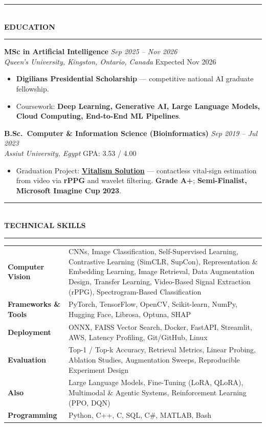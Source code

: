 \documentclass[10pt, a4paper]{article}
\newcommand{\cvsection}[1]{%
  \vspace{3pt}%
  {\color{navy}\rule{\linewidth}{1.1pt}}\\[0.5pt]%
  {\color{navy}\bfseries\fontsize{9.5}{11}\selectfont\uppercase{#1}}\\[-4pt]%
  {\color{teal}\rule{\linewidth}{0.6pt}}%
  \vspace{2pt}%
}
\newcommand{\cventry}[4]{%
  \vspace{2.5pt}%
  \textbf{\color{darkgray}#1} \hfill {\color{midgray}\textit{#3}}\\[-1.5pt]%
  {\color{teal}\textit{#2}} \hfill {\color{midgray}#4}%
}
\newenvironment{cvitems}{%
  \begin{itemize}[leftmargin=11pt, itemsep=0.5pt, parsep=0pt, topsep=1pt,
                  label={\textcolor{teal}{$\bullet$}}]
}{%
  \end{itemize}%
}
\begin{document}
\cvsection{Education}

\cventry{MSc in Artificial Intelligence}{Queen's University, Kingston, Ontario, Canada}
        {Sep 2025 -- Nov 2026}{Expected Nov 2026}
\begin{cvitems}
  \item \textbf{Digilians Presidential Scholarship} --- competitive national AI graduate fellowship.
  \item Coursework: \textbf{Deep Learning, Generative AI, Large Language Models, Cloud Computing, End-to-End ML Pipelines}.
\end{cvitems}

\cventry{B.Sc.\ Computer \& Information Science (Bioinformatics)}{Assiut University, Egypt}
        {Sep 2019 -- Jul 2023}{GPA: 3.53 / 4.00}
\begin{cvitems}
  \item Graduation Project: \href{https://vitalismsolution.github.io/}{\textbf{Vitalism Solution}} --- contactless vital-sign estimation from video via \textbf{rPPG} and wavelet filtering. \textbf{Grade A+}; \textbf{Semi-Finalist, Microsoft Imagine Cup 2023}.
\end{cvitems}

\cvsection{Technical Skills}

\renewcommand{\arraystretch}{1.1}
\begin{tabularx}{\linewidth}{@{}>{\raggedright\hyphenpenalty=10000\arraybackslash}p{35mm} X@{}}
\textbf{Computer Vision} &
CNNs, Image Classification, Self-Supervised Learning, Contrastive Learning (SimCLR, SupCon), Representation \& Embedding Learning, Image Retrieval, Data Augmentation Design, Transfer Learning, Video-Based Signal Extraction (rPPG), Spectrogram-Based Classification \\

\textbf{Frameworks \& Tools} &
PyTorch, TensorFlow, OpenCV, Scikit-learn, NumPy, Hugging Face, Librosa, Optuna, SHAP \\

\textbf{Deployment} &
ONNX, FAISS Vector Search, Docker, FastAPI, Streamlit, AWS, Latency Profiling, Git/GitHub, Linux \\

\textbf{Evaluation} &
Top-1 / Top-k Accuracy, Retrieval Metrics, Linear Probing, Ablation Studies, Augmentation Sweeps, Reproducible Experiment Design \\

\textbf{Also} &
Large Language Models, Fine-Tuning (LoRA, QLoRA), Multimodal \& Agentic Systems, Reinforcement Learning (PPO, DQN) \\

\textbf{Programming} &
Python, C++, C, SQL, C\#, MATLAB, Bash \\
\end{tabularx}
\end{document}
